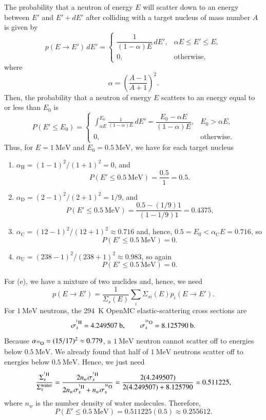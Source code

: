 \begin{adaptedsolution}
The probability that a neutron of energy $E$ will scatter down to an energy
between $E'$ and $E'+dE'$ after colliding with a target nucleus of mass number
$A$ is given by
\[
 p(E\to E')\,dE'=
 \begin{cases}
 \dfrac{1}{(1-\alpha)E}\,dE',&\alpha E\leq E'\leq E,\\
 0,&\text{otherwise},
 \end{cases}
 \tag{FNRP 2.47}
\]
where
\[
 \alpha=\left(\frac{A-1}{A+1}\right)^2.
\]
Then, the probability that a neutron of energy $E$ scatters to an energy
equal to or less than $E_0$ is
\[
 P(E'\leq E_0)=
 \begin{cases}
 \displaystyle\int_{\alpha E}^{E_0}
 \frac{1}{(1-\alpha)E}\,dE'
 =\dfrac{E_0-\alpha E}{(1-\alpha)E},&E_0>\alpha E,\\[3pt]
 0,&\text{otherwise}.
 \end{cases}
\]
Thus, for $E=1~\mathrm{MeV}$ and $E_0=0.5~\mathrm{MeV}$, we have for each
target nucleus
\begin{enumerate}[label=(\alph*)]
\item $\alpha_{\mathrm H}=(1-1)^2/(1+1)^2=0$, and
\[
 \boxed{P(E'\leq0.5~\mathrm{MeV})=\frac{0.5}{1}=0.5}.
\]

\item $\alpha_{\mathrm D}=(2-1)^2/(2+1)^2=1/9$, and
\[
 \boxed{P(E'\leq0.5~\mathrm{MeV})
 =\frac{0.5-(1/9)1}{(1-1/9)1}=0.4375}.
\]

\item $\alpha_{\mathrm C}=(12-1)^2/(12+1)^2\approx0.716$ and, hence,
$0.5=E_0<\alpha_{\mathrm C}E=0.716$, so
\[
 \boxed{P(E'\leq0.5~\mathrm{MeV})=0}.
\]

\item $\alpha_{\mathrm U}=(238-1)^2/(238+1)^2\approx0.983$, so again
\[
 \boxed{P(E'\leq0.5~\mathrm{MeV})=0}.
\]
\end{enumerate}

For (e), we have a mixture of two nuclides and, hence, we need
\[
 p(E\to E')=\frac{1}{\Sigma_s(E)}
 \sum_i\Sigma_{s i}(E)p_i(E\to E').
 \tag{FNRP 2.53}
\]
For $1~\mathrm{MeV}$ neutrons, the 294~K OpenMC elastic-scattering cross
sections are
\[
 \sigma_s^{\isoA{H}{1}}=4.249507~\mathrm b,
 \qquad
 \sigma_s^{\isoA{O}{16}}=8.125790~\mathrm b.
\]
Because $\alpha_{\isoA{O}{16}}=(15/17)^2\approx0.779$, a $1~\mathrm{MeV}$
neutron cannot scatter off  to energies below
$0.5~\mathrm{MeV}$. We already found that half of $1~\mathrm{MeV}$ neutrons
scatter off  to energies below $0.5~\mathrm{MeV}$. Hence, we just
need
\[
 \frac{\Sigma_s^{\isoA{H}{1}}}{\Sigma_s^{\text{water}}}
 =\frac{2n_w\sigma_s^{\isoA{H}{1}}}
 {2n_w\sigma_s^{\isoA{H}{1}}+n_w\sigma_s^{\isoA{O}{16}}}
 =\frac{2(4.249507)}{2(4.249507)+8.125790}
 \approx0.511225,
\]
where $n_w$ is the number density of water molecules. Therefore,
\[
 \boxed{P(E'\leq0.5~\mathrm{MeV})
 =0.511225(0.5)\approx0.255612}.
\]
\end{adaptedsolution}

